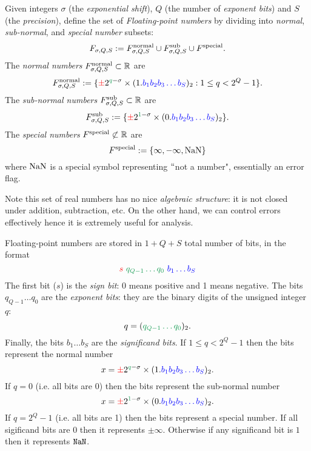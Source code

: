 \begin{definition} Given integers $\ensuremath{\sigma}$ (the \emph{exponential shift}), $Q$ (the number of \emph{exponent bits}) and  $S$ (the \emph{precision}), define the set of \emph{Floating-point numbers} by dividing into \emph{normal}, \emph{sub-normal}, and \emph{special number} subsets:
\[
F_{\ensuremath{\sigma},Q,S} := F^{\rm normal}_{\ensuremath{\sigma},Q,S} \cup F^{\rm sub}_{\ensuremath{\sigma},Q,S} \cup F^{\rm special}.
\]
The \emph{normal numbers} $F^{\rm normal}_{\sigma,Q,S} \subset {\mathbb R}$ are
\[
F^{\rm normal}_{\ensuremath{\sigma},Q,S} := \{\red{\ensuremath{\pm}} 2^{\green{q}-\ensuremath{\sigma}} \ensuremath{\times} (1.\blue{b_1b_2b_3\ensuremath{\ldots}b_S})_2 : 1 \ensuremath{\leq} q < 2^Q-1 \}.
\]
The \emph{sub-normal numbers} $F^{\rm sub}_{\sigma,Q,S} \subset {\mathbb R}$ are
\[
F^{\rm sub}_{\ensuremath{\sigma},Q,S} := \{\red{\ensuremath{\pm}} 2^{\green{1}-\ensuremath{\sigma}} \ensuremath{\times} (0.\blue{b_1b_2b_3\ensuremath{\ldots}b_S})_2\}.
\]
The \emph{special numbers} $F^{\rm special} \not\subset {\mathbb R}$ are 
\[
F^{\rm special} :=  \{\ensuremath{\infty}, -\ensuremath{\infty}, {\rm NaN}\}
\]
where ${\rm NaN}$ is a special symbol representing \ensuremath{\ldq}not a number", essentially an error flag. \end{definition}

Note this set of real numbers has no nice \emph{algebraic structure}: it is not closed under addition, subtraction, etc. On the other hand, we can control errors effectively hence it is extremely useful for analysis.

Floating-point numbers are stored in $1 + Q + S$ total number of bits, in the format
\[
\red{s}\ \green{q_{Q-1}\ensuremath{\ldots}q_0}\ \blue{b_1\ensuremath{\ldots}b_S}
\]
The first bit ($s$) is the \emph{sign bit}: 0 means positive and 1 means negative. The bits $q_{Q-1}\ensuremath{\ldots}q_0$ are the \emph{exponent bits}: they are the binary digits of the unsigned integer $q$: 
\[
q = (\green{q_{Q-1}\ensuremath{\ldots}q_0})_2.
\]
Finally, the bits $b_1\ensuremath{\ldots}b_S$ are the \emph{significand bits}. If $1 \ensuremath{\leq} q < 2^Q-1$ then the bits represent the normal number
\[
x = \red{\ensuremath{\pm}} 2^{\green{q}-\ensuremath{\sigma}} \ensuremath{\times} (1.\blue{b_1b_2b_3\ensuremath{\ldots}b_S})_2.
\]
If $q = 0$ (i.e. all bits are 0) then the bits represent the sub-normal number
\[
x = \red{\ensuremath{\pm}} 2^{\green{1}-\ensuremath{\sigma}} \ensuremath{\times} (0.\blue{b_1b_2b_3\ensuremath{\ldots}b_S})_2.
\]
If $q = 2^Q-1$  (i.e. all bits are 1) then the bits represent a special number. If all sigificand bits are $0$ then it represents $\ensuremath{\pm}\ensuremath{\infty}$. Otherwise if any significand bit is $1$ then it represents ${\tt NaN}$.

